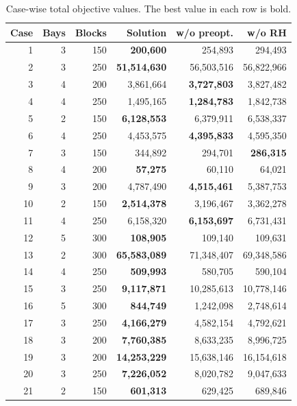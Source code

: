\documentclass[runningheads]{llncs}
\begin{document}
\begin{table}[t]
  \centering
  \caption{Case-wise total objective values. The best value in each row is bold.}
  \label{tab:case-results}
  \scriptsize
  \setlength{\tabcolsep}{4pt}
  \renewcommand{\arraystretch}{0.88}
  \begin{tabular}{rrrrrr}
    \hline
    Case & Bays & Blocks & Solution & w/o preopt. & w/o RH \\
    \hline
     1 & 3 & 150 & \textbf{200,600} & 254,893 & 294,493 \\
     2 & 3 & 250 & \textbf{51,514,630} & 56,503,516 & 56,822,966 \\
     3 & 4 & 200 & 3,861,664 & \textbf{3,727,803} & 3,827,482 \\
     4 & 4 & 250 & 1,495,165 & \textbf{1,284,783} & 1,842,738 \\
     5 & 2 & 150 & \textbf{6,128,553} & 6,379,911 & 6,538,337 \\
     6 & 4 & 250 & 4,453,575 & \textbf{4,395,833} & 4,595,350 \\
     7 & 3 & 150 & 344,892 & 294,701 & \textbf{286,315} \\
     8 & 4 & 200 & \textbf{57,275} & 60,110 & 64,021 \\
     9 & 3 & 200 & 4,787,490 & \textbf{4,515,461} & 5,387,753 \\
    10 & 2 & 150 & \textbf{2,514,378} & 3,196,467 & 3,362,278 \\
    11 & 4 & 250 & 6,158,320 & \textbf{6,153,697} & 6,731,431 \\
    12 & 5 & 300 & \textbf{108,905} & 109,140 & 109,631 \\
    13 & 2 & 300 & \textbf{65,583,089} & 71,348,407 & 69,348,586 \\
    14 & 4 & 250 & \textbf{509,993} & 580,705 & 590,104 \\
    15 & 3 & 250 & \textbf{9,117,871} & 10,285,613 & 10,778,146 \\
    16 & 5 & 300 & \textbf{844,749} & 1,242,098 & 2,748,614 \\
    17 & 3 & 250 & \textbf{4,166,279} & 4,582,154 & 4,792,621 \\
    18 & 3 & 200 & \textbf{7,760,385} & 8,633,235 & 8,996,725 \\
    19 & 3 & 200 & \textbf{14,253,229} & 15,638,146 & 16,154,618 \\
    20 & 3 & 250 & \textbf{7,226,052} & 8,020,782 & 9,047,633 \\
    21 & 2 & 150 & \textbf{601,313} & 629,425 & 689,846 \\

\end{tabular}
\end{table}
\end{document}
